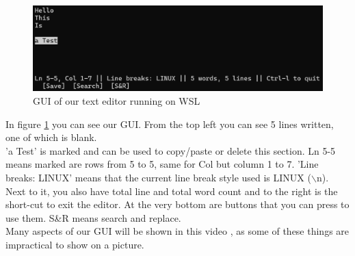 \begin{figure}[h]
    \centering
    \includegraphics[width=1.0\linewidth]{figures/results_terminal.png}
    \caption{GUI of our text editor running on WSL}
    \label{fig:GUIterminal}            
\end{figure}
\noindent
In figure \ref{fig:GUIterminal} you can see our GUI. From the top left you can see 5 lines written, one of which is blank.
\\'a Test' is marked and can be used to copy/paste or delete this section.
Ln 5-5 means marked are rows from 5 to 5, same for Col but column 1 to 7.
'Line breaks: LINUX' means that the current line break style used is LINUX ($\backslash$n).
\\Next to it, you also have total line and total word count and to the right is the short-cut to exit the editor.
At the very bottom are buttons that you can press to use them. S\&R means search and replace.
\\Many aspects of our GUI will be shown in this video \cite{demo}, as some of these things are impractical to show on a picture.